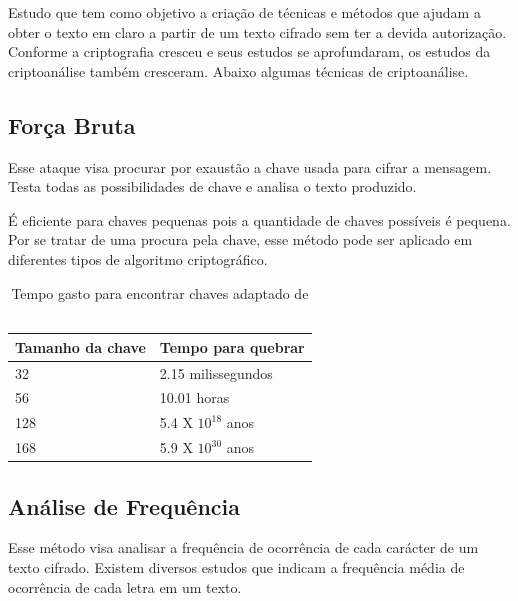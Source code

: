Estudo que tem como objetivo a criação de técnicas e métodos que ajudam a obter o texto em claro a partir de um texto cifrado sem ter a devida autorização. Conforme a criptografia cresceu e seus estudos se aprofundaram, os estudos da criptoanálise também cresceram. Abaixo algumas técnicas de criptoanálise.

\subsection{Força Bruta}
\label{brute-force}

Esse ataque visa procurar por exaustão a chave usada para cifrar a mensagem. Testa todas as possibilidades de chave e analisa o texto produzido. 

É eficiente para chaves pequenas pois a quantidade de chaves possíveis é pequena. Por se tratar de uma procura pela chave, esse método pode ser aplicado em diferentes tipos de algoritmo criptográfico.

\begin{table}[h]
\centering
	\begin{tabular}{|l|l|}
		\hline
		Tamanho da chave & Tempo para quebrar \\ \hline
		32 & 2.15 milissegundos \\ \hline
		56 & 10.01 horas \\ \hline
		128 & 5.4 X $ 10 ^{18}$ anos \\ \hline
		168 & 5.9 X $ 10 ^{30}$ anos \\ \hline
	\end{tabular}
\caption[{Tempo gasto para encontrar chaves}] {Tempo gasto para encontrar chaves adaptado de ~\cite{william-stallings}}
\end{table}

\subsection{Análise de Frequência}
\label{frequency-analysis}

Esse método visa analisar a frequência de ocorrência de cada carácter de um texto cifrado. Existem diversos estudos que indicam a frequência média de ocorrência de cada letra em um texto. 

